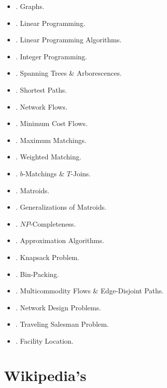 \documentclass{article}
\newtheorem{problem}{Problem}
\begin{document}
\begin{itemize}
    \item {. Graphs.}
    \item {. Linear Programming.}
    \item {. Linear Programming Algorithms.}
    \item {. Integer Programming.}
    \item {. Spanning Trees \& Arborescences.}
    \item {. Shortest Paths.}
    \item {. Network Flows.}
    \item {. Minimum Cost Flows.}
    \item {. Maximum Matchings.}
    \item {. Weighted Matching.}
    \item {. $b$-Matchings \& $T$-Joins.}
    \item {. Matroids.}
    \item {. Generalizations of Matroids.}
    \item {. $NP$-Completeness.}
    \item {. Approximation Algorithms.}
    \item {. Knapsack Problem.}
    \item {. Bin-Packing.}
    \item {. Multicommodity Flows \& Edge-Disjoint Paths.}
    \item {. Network Design Problems.}
    \item {. Traveling Salesman Problem.}
    \item {. Facility Location.}
\end{itemize}


\section{Wikipedia's}
\end{document}
